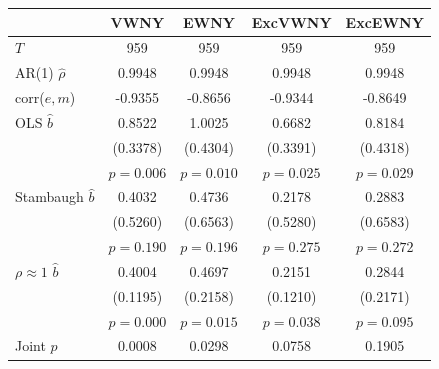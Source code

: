 \begin{tabular}{lcccc}
\toprule
 & VWNY & EWNY & ExcVWNY & ExcEWNY \\
\midrule
$T$ & 959 & 959 & 959 & 959 \\
AR(1) $\hat\rho$ & 0.9948 & 0.9948 & 0.9948 & 0.9948 \\
corr($e,m$) & -0.9355 & -0.8656 & -0.9344 & -0.8649 \\
\midrule
OLS $\hat b$ & 0.8522 & 1.0025 & 0.6682 & 0.8184 \\
 & (0.3378) & (0.4304) & (0.3391) & (0.4318) \\
 & $p=0.006$ & $p=0.010$ & $p=0.025$ & $p=0.029$ \\
Stambaugh $\hat b$ & 0.4032 & 0.4736 & 0.2178 & 0.2883 \\
 & (0.5260) & (0.6563) & (0.5280) & (0.6583) \\
 & $p=0.190$ & $p=0.196$ & $p=0.275$ & $p=0.272$ \\
$\rho\approx1$ $\hat b$ & 0.4004 & 0.4697 & 0.2151 & 0.2844 \\
 & (0.1195) & (0.2158) & (0.1210) & (0.2171) \\
 & $p=0.000$ & $p=0.015$ & $p=0.038$ & $p=0.095$ \\
\midrule
Joint $p$ & 0.0008 & 0.0298 & 0.0758 & 0.1905 \\
\bottomrule
\end{tabular}
